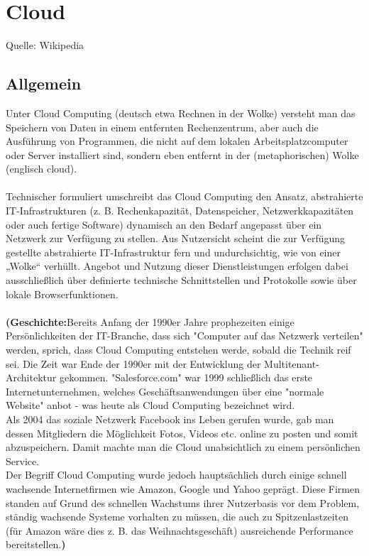 \chapter{Cloud}
Quelle: Wikipedia
\section{Allgemein}
Unter Cloud Computing (deutsch etwa Rechnen in der Wolke) versteht man das Speichern von Daten in einem entfernten Rechenzentrum, aber auch die Ausführung von Programmen, die nicht auf dem lokalen Arbeitsplatzcomputer oder Server installiert sind, sondern eben entfernt in der (metaphorischen) Wolke (englisch cloud).\\\\
Technischer formuliert umschreibt das Cloud Computing den Ansatz, abstrahierte IT-Infrastrukturen (z. B. Rechenkapazität, Datenspeicher, Netzwerkkapazitäten oder auch fertige Software) dynamisch an den Bedarf angepasst über ein Netzwerk zur Verfügung zu stellen. Aus Nutzersicht scheint die zur Verfügung gestellte abstrahierte IT-Infrastruktur fern und undurchsichtig, wie von einer „Wolke“ verhüllt. Angebot und Nutzung dieser Dienstleistungen erfolgen dabei ausschließlich über definierte technische Schnittstellen und Protokolle sowie über lokale Browserfunktionen.\\\\
\textbf{(Geschichte:}Bereits Anfang der 1990er Jahre prophezeiten einige Persönlichkeiten der IT-Branche, dass sich "Computer auf das Netzwerk verteilen" werden, sprich, dass Cloud Computing entstehen werde, sobald die Technik reif sei. Die Zeit war Ende der 1990er mit der Entwicklung der Multitenant-Architektur gekommen. "Salesforce.com" war 1999 schließlich das erste Internetunternehmen, welches Geschäftsanwendungen über eine "normale Website" anbot - was heute als Cloud Computing bezeichnet wird.\\
Als 2004 das soziale Netzwerk Facebook ins Leben gerufen wurde, gab man dessen Mitgliedern die Möglichkeit Fotos, Videos etc. online zu posten und somit abzuspeichern. Damit machte man die Cloud unabsichtlich zu einem persönlichen Service.\\
Der Begriff Cloud Computing wurde jedoch hauptsächlich durch einige schnell wachsende Internetfirmen wie Amazon, Google und Yahoo geprägt. Diese Firmen standen auf Grund des schnellen Wachstums ihrer Nutzerbasis vor dem Problem, ständig wachsende Systeme vorhalten zu müssen, die auch zu Spitzenlastzeiten (für Amazon wäre dies z. B. das Weihnachtsgeschäft) ausreichende Performance bereitstellen.\textbf)

